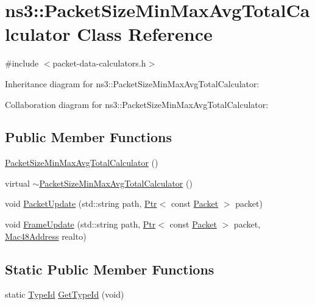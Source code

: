 \hypertarget{classns3_1_1PacketSizeMinMaxAvgTotalCalculator}{}\section{ns3\+:\+:Packet\+Size\+Min\+Max\+Avg\+Total\+Calculator Class Reference}
\label{classns3_1_1PacketSizeMinMaxAvgTotalCalculator}


{\ttfamily \#include $<$packet-\/data-\/calculators.\+h$>$}



Inheritance diagram for ns3\+:\+:Packet\+Size\+Min\+Max\+Avg\+Total\+Calculator\+:


Collaboration diagram for ns3\+:\+:Packet\+Size\+Min\+Max\+Avg\+Total\+Calculator\+:
\subsection*{Public Member Functions}
\begin{DoxyCompactItemize}
\item 
\hyperlink{classns3_1_1PacketSizeMinMaxAvgTotalCalculator_a82df2ec3be815a359d42d59b90767c44}{Packet\+Size\+Min\+Max\+Avg\+Total\+Calculator} ()
\item 
virtual \hyperlink{classns3_1_1PacketSizeMinMaxAvgTotalCalculator_a2eadbbb8a68adc5c05f7d9fbd2c0c52c}{$\sim$\+Packet\+Size\+Min\+Max\+Avg\+Total\+Calculator} ()
\item 
void \hyperlink{classns3_1_1PacketSizeMinMaxAvgTotalCalculator_af13660c85c0a619e05012f84b81db612}{Packet\+Update} (std\+::string path, \hyperlink{classns3_1_1Ptr}{Ptr}$<$ const \hyperlink{classns3_1_1Packet}{Packet} $>$ packet)
\item 
void \hyperlink{classns3_1_1PacketSizeMinMaxAvgTotalCalculator_a2e96ea817aa81f80dc96bff8c9a42342}{Frame\+Update} (std\+::string path, \hyperlink{classns3_1_1Ptr}{Ptr}$<$ const \hyperlink{classns3_1_1Packet}{Packet} $>$ packet, \hyperlink{classns3_1_1Mac48Address}{Mac48\+Address} realto)
\end{DoxyCompactItemize}
\subsection*{Static Public Member Functions}
\begin{DoxyCompactItemize}
\item 
static \hyperlink{classns3_1_1TypeId}{Type\+Id} \hyperlink{classns3_1_1PacketSizeMinMaxAvgTotalCalculator_ac5d2df48b5519b5c9ad3d30785636ce4}{Get\+Type\+Id} (void)
\end{DoxyCompactItemize}
